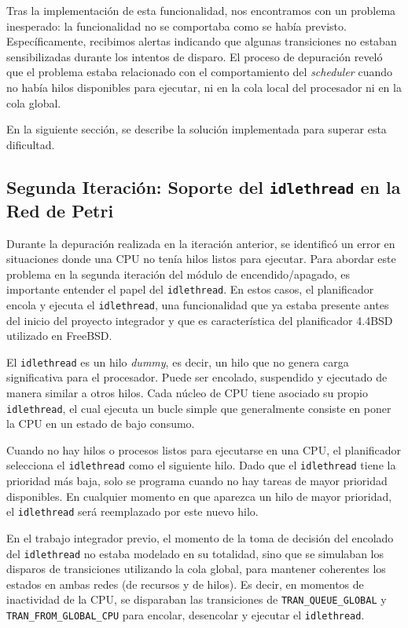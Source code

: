 Tras la implementación de esta funcionalidad, nos encontramos con un problema inesperado: la funcionalidad no se comportaba como se había previsto. Específicamente, recibimos alertas indicando que algunas transiciones no estaban sensibilizadas durante los intentos de disparo. El proceso de depuración reveló que el problema estaba relacionado con el comportamiento del \textit{scheduler} cuando no había hilos disponibles para ejecutar, ni en la cola local del procesador ni en la cola global.\par

En la siguiente sección, se describe la solución implementada para superar esta dificultad.\par

\subsection{Segunda Iteración: Soporte del \texttt{idlethread} en la Red de Petri}
\label{ch:idlethread}

Durante la depuración realizada en la iteración anterior, se identificó un error en situaciones donde una CPU no tenía hilos listos para ejecutar. Para abordar este problema en la segunda iteración del módulo de encendido/apagado, es importante entender el papel del \texttt{idlethread}. En estos casos, el planificador encola y ejecuta el \texttt{idlethread}, una funcionalidad que ya estaba presente antes del inicio del proyecto integrador y que es característica del planificador 4.4BSD utilizado en FreeBSD.\par

El \texttt{idlethread} es un hilo \textit{dummy}, es decir, un hilo que no genera carga significativa para el procesador. Puede ser encolado, suspendido y ejecutado de manera similar a otros hilos. Cada núcleo de CPU tiene asociado su propio \texttt{idlethread}, el cual ejecuta un bucle simple que generalmente consiste en poner la CPU en un estado de bajo consumo.\par

Cuando no hay hilos o procesos listos para ejecutarse en una CPU, el planificador selecciona el \texttt{idlethread} como el siguiente hilo. Dado que el \texttt{idlethread} tiene la prioridad más baja, solo se programa cuando no hay tareas de mayor prioridad disponibles. En cualquier momento en que aparezca un hilo de mayor prioridad, el \texttt{idlethread} será reemplazado por este nuevo hilo.\par

En el trabajo integrador previo, el momento de la toma de decisión del encolado del \texttt{idlethread} no estaba modelado en su totalidad, sino que se simulaban los disparos de transiciones utilizando la cola global, para mantener coherentes los estados en ambas redes (de recursos y de hilos). Es decir, en momentos de inactividad de la CPU, se disparaban las transiciones de \verb|TRAN_QUEUE_GLOBAL| y \verb|TRAN_FROM_GLOBAL_CPU| para encolar, desencolar y ejecutar el \texttt{idlethread}.\par

